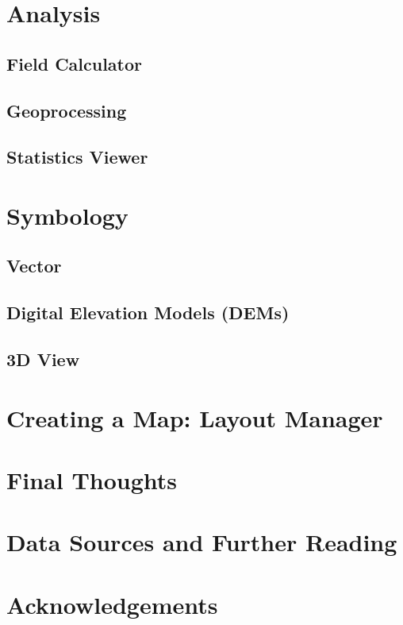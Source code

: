 \documentclass{article}
\begin{document}
\section{Analysis}

\subsection{Field Calculator}

\subsection{Geoprocessing}

\subsection{Statistics Viewer}

\section{Symbology}

\subsection{Vector}

\subsection{Digital Elevation Models (DEMs)}

\subsection{3D View}

\section{Creating a Map: Layout Manager}

\section{Final Thoughts}

\section{Data Sources and Further Reading}

\section{Acknowledgements}

\newpage
\printbibliography
\end{document}
